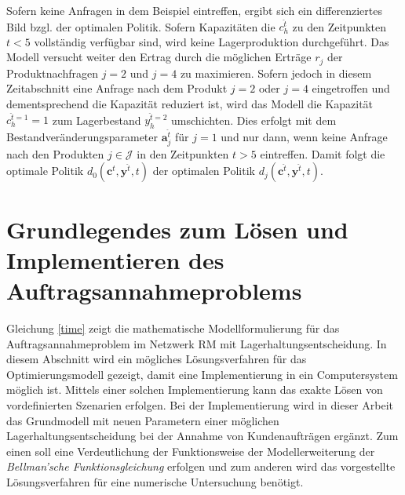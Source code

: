 Sofern keine Anfragen in dem Beispiel eintreffen, ergibt sich ein differenziertes Bild bzgl. der optimalen Politik. Sofern Kapazitäten die $c_{h}^{\hat t}$ zu den Zeitpunkten $t<5$ vollständig verfügbar sind, wird keine Lagerproduktion durchgeführt. Das Modell versucht weiter den Ertrag durch die möglichen Erträge $r_j$ der Produktnachfragen $j=2$ und $j=4$ zu maximieren. Sofern jedoch in diesem Zeitabschnitt eine Anfrage nach dem Produkt $j=2$ oder $j=4$ eingetroffen und dementsprechend die Kapazität reduziert ist, wird das Modell die Kapazität $c_{h}^{\hat t=1}=1$ zum Lagerbestand $y_{h}^{\hat t=2}$ umschichten. Dies erfolgt mit dem Bestandveränderungsparameter $\textbf{a}_j^{\hat t}$ für $j=1$ und nur dann, wenn keine Anfrage nach den Produkten $j\in\mathcal{J}$ in den Zeitpunkten $t>5$ eintreffen. Damit folgt die optimale Politik $d_{0}({\textbf{c}^{\hat t},\textbf{y}^{\hat t}, t})$ der optimalen Politik $d_{j}({\textbf{c}^{\hat t},\textbf{y}^{\hat t}, t})$.



\section{Grundlegendes zum Lösen und Implementieren des Auftragsannahmeproblems}\label{Implementierung}

Gleichung \eqref{time} zeigt die mathematische Modellformulierung für das Auftragsannahmeproblem im Netzwerk RM mit Lagerhaltungsentscheidung. In diesem Abschnitt wird ein mögliches Lösungsverfahren für das Optimierungsmodell gezeigt, damit eine Implementierung in ein Computersystem möglich ist. Mittels einer solchen Implementierung kann das exakte Lösen von vordefinierten Szenarien erfolgen. Bei der Implementierung wird in dieser Arbeit das Grundmodell mit neuen Parametern einer möglichen Lagerhaltungsentscheidung bei der Annahme von Kundenaufträgen ergänzt. Zum einen soll eine Verdeutlichung der Funktionsweise der Modellerweiterung der \textit{Bellman'sche Funktionsgleichung} erfolgen und zum anderen wird das vorgestellte Lösungsverfahren für eine numerische Untersuchung benötigt.

